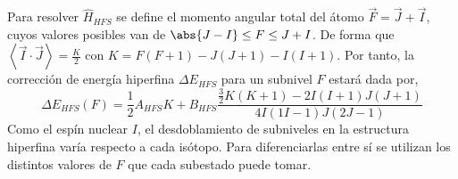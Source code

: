 Para resolver $\hat{H}_{HFS}$ se define el momento angular total del átomo $\vec{F} = \vec{J} + \vec{I}$, cuyos valores posibles van de $\abs{J-I} \leq F  \leq J + I$. De forma que $\left\langle \vec{I} \cdot \vec{J} \right\rangle = \frac{K}{2}$ con $K = F(F+1) - J(J+1) - I(I+1)$. Por tanto, la corrección de energía hiperfina $\Delta E_{HFS}$ para un subnivel $F$ estará dada por,
\begin{equation}
    \Delta E_{HFS} (F) = \frac{1}{2}A_{HFS}K + B_{HFS} \frac{\frac{3}{2}K(K+1) -2I(I+1)J(J+1)}{4I(1I-1)J(2J-1)}
\end{equation}
Como el espín nuclear $I$, el desdoblamiento de subniveles en la estructura hiperfina varía respecto a cada isótopo. Para diferenciarlas entre sí se utilizan los distintos valores de $F$ que cada subestado puede tomar.
\nocite{*}